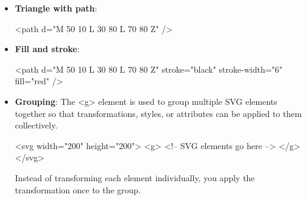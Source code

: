 \documentclass{report}
\begin{document}
\begin{itemize}
\begin{itemize}
                \item \textbf{Cubic Bézier (C)}: 
                    \bigbreak \noindent 
                    \begin{center}
                        C x1 y1, x2  y2, x y
                    \end{center}
                    Two control points, more control.
                \item \textbf{Arc Command (Rounded Shapes) (A)}: 
                    \bigbreak \noindent 
                    \begin{center}
                        A rx ry x-axis-rotation large-arc sweep x y
                    \end{center}
            \end{itemize}
            Note the difference between lowercase and uppercase control characters
            \begin{itemize}
                \item \textbf{Uppercase}:	Absolute position
                \item \textbf{Lowercase}:	Relative movement
            \end{itemize}
        \item \textbf{Triangle with path}: 
            \bigbreak \noindent 
            \begin{htmlcode}
                <path d="M 50 10 L 30 80 L 70 80 Z" />
            \end{htmlcode}
        \item \textbf{Fill and stroke}: 
            \bigbreak \noindent 
            \begin{htmlcode}
                <path d="M 50 10 L 30 80 L 70 80 Z" 
                stroke="black"
                stroke-width="6"
                fill="red"
                />
            \end{htmlcode}
        \item \textbf{Grouping}: The <g> element is used to group multiple SVG elements together so that transformations, styles, or attributes can be applied to them collectively.
            \bigbreak \noindent 
            \begin{htmlcode}
                <svg width="200" height="200">
                    <g>
                        <!-- SVG elements go here -->
                    </g>
                </svg>
            \end{htmlcode}
            \bigbreak \noindent 
            Instead of transforming each element individually, you apply the transformation once to the group.

\end{itemize}
\end{document}
